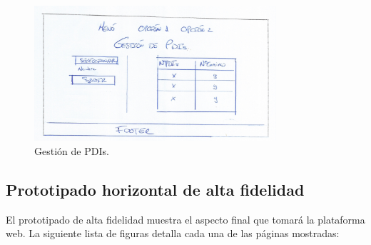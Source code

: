 \begin{figure}[!htbp]
  \centering
    \includegraphics[width=0.8\textwidth]{../img/prototipado/baja/pdis.png}
  \caption{Gestión de PDIs.}
  \label{pdis}
\end{figure}

\subsection{Prototipado horizontal de alta fidelidad} 
El prototipado de alta fidelidad muestra el aspecto final que tomará la plataforma web. La siguiente lista de figuras detalla cada una de las páginas mostradas:

